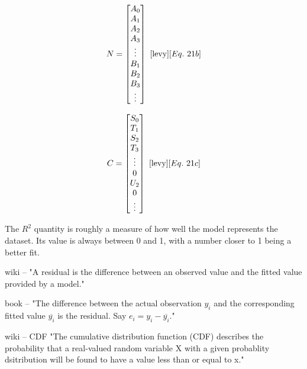 \begin{multicols}{2}
\begin{equation}
N = 
\begin{bmatrix}
A_0 \\
A_1 \\
A_2 \\
A_3 \\
\vdots \\
B_1 \\
B_2 \\
B_3 \\
\vdots
\end{bmatrix}
~\cite{levy}[Eq.~21b]
\end{equation}

\begin{equation}
C = 
\begin{bmatrix}
S_0 \\
T_1 \\
S_2 \\
T_3 \\
\vdots \\
0   \\
U_2 \\
0   \\
\vdots
\end{bmatrix}
~\cite{levy}[Eq.~21c]
\end{equation}
\end{multicols}

The $R^2$ quantity is roughly a measure of how well the model represents the dataset. Its value is always between 0 and 1, with a number closer to 1 being a better fit. 

wiki -- "A residual is the difference between an observed value and the fitted value provided by a model."

book -- "The difference between the actual observation $y_i$ and the corresponding fitted value $\overline{y_i}$ is the residual. Say $e_i = y_i - \overline{y_i}$."

wiki -- CDF "The cumulative distribution function (CDF) describes the probability that a real-valued random variable X with a given probablity dsitribution will be found to have a value less than or equal to x."
